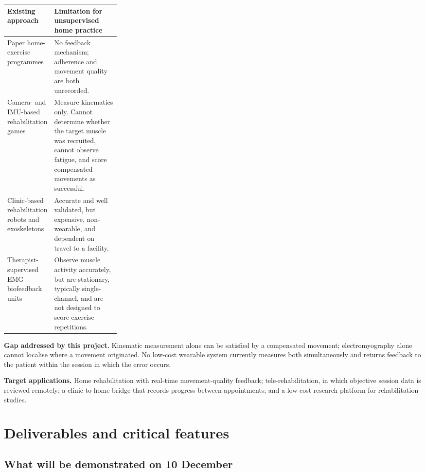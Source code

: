 \documentclass[11pt]{article}
\begin{document}
\begin{table}[H]
\centering\small
\begin{tabularx}{\linewidth}{@{}>{\raggedright\arraybackslash}p{0.27\linewidth} X@{}}
\toprule
\textbf{Existing approach} & \textbf{Limitation for unsupervised home practice} \\
\midrule
Paper home-exercise programmes & No feedback mechanism; adherence and movement quality are both unrecorded. \\
Camera- and IMU-based rehabilitation games & Measure kinematics only. Cannot determine whether the target muscle was recruited, cannot observe fatigue, and score compensated movements as successful. \\
Clinic-based rehabilitation robots and exoskeletons & Accurate and well validated, but expensive, non-wearable, and dependent on travel to a facility. \\
Therapist-supervised EMG biofeedback units & Observe muscle activity accurately, but are stationary, typically single-channel, and are not designed to score exercise repetitions. \\
\bottomrule
\end{tabularx}
\end{table}

\begin{callout}
\textbf{Gap addressed by this project.} Kinematic measurement alone can be
satisfied by a compensated movement; electromyography alone cannot localise
where a movement originated. No low-cost wearable system currently measures both
simultaneously and returns feedback to the patient within the session in which
the error occurs.
\end{callout}

\noindent
\textbf{Target applications.} Home rehabilitation with real-time movement-quality
feedback; tele-rehabilitation, in which objective session data is reviewed
remotely; a clinic-to-home bridge that records progress between appointments;
and a low-cost research platform for rehabilitation studies.

\section{Deliverables and critical features}

\subsection{What will be demonstrated on 10 December}
\end{document}
